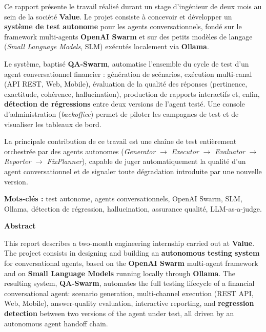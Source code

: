 \documentclass[12pt,a4paper,oneside]{report}
\begin{document}
Ce rapport présente le travail réalisé durant un stage d'ingénieur de deux mois au
sein de la société \textbf{Value}. Le projet consiste à concevoir et développer un
\textbf{système de test autonome} pour les agents conversationnels, fondé sur le
framework multi-agents \textbf{OpenAI Swarm} et sur des petits modèles de langage
(\textit{Small Language Models}, SLM) exécutés localement via \textbf{Ollama}.

Le système, baptisé \textbf{QA-Swarm}, automatise l'ensemble du cycle de test d'un
agent conversationnel financier : génération de scénarios, exécution multi-canal
(API REST, Web, Mobile), évaluation de la qualité des réponses (pertinence,
exactitude, cohérence, hallucination), production de rapports interactifs et, enfin,
\textbf{détection de régressions} entre deux versions de l'agent testé. Une console
d'administration (\textit{backoffice}) permet de piloter les campagnes de test et de
visualiser les tableaux de bord.

La principale contribution de ce travail est une chaîne de test entièrement
orchestrée par des agents autonomes (\textit{Generator} $\rightarrow$
\textit{Executor} $\rightarrow$ \textit{Evaluator} $\rightarrow$ \textit{Reporter}
$\rightarrow$ \textit{FixPlanner}), capable de juger automatiquement la qualité d'un
agent conversationnel et de signaler toute dégradation introduite par une nouvelle
version.

\vspace{0.3cm}
\noindent\textbf{Mots-clés :} test autonome, agents conversationnels, OpenAI Swarm,
SLM, Ollama, détection de régression, hallucination, assurance qualité, LLM-as-a-judge.

\vspace{0.5cm}
\noindent\textbf{\large Abstract}
\vspace{0.15cm}


This report describes a two-month engineering internship carried out at
\textbf{Value}. The project consists in designing and building an
\textbf{autonomous testing system} for conversational agents, based on the
\textbf{OpenAI Swarm} multi-agent framework and on \textbf{Small Language Models}
running locally through \textbf{Ollama}. The resulting system, \textbf{QA-Swarm},
automates the full testing lifecycle of a financial conversational agent: scenario
generation, multi-channel execution (REST API, Web, Mobile), answer-quality
evaluation, interactive reporting, and \textbf{regression detection} between two
versions of the agent under test, all driven by an autonomous agent handoff chain.
\end{document}
